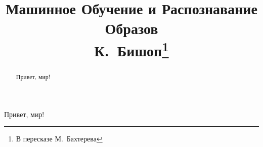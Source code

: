 \documentclass[14pt]{extarticle}
\title{%
  \textbf{Машинное Обучение и Распознавание Образов}\\
  {\large К.~Бишоп\footnote{В пересказе М.~Бахтерева}}}
\begin{document}
\maketitle
\begin{abstract}
  Привет, мир!
\end{abstract}


\thispagestyle{fancy}
\pagebreak

\tableofcontents

Привет, мир!
\end{document}
